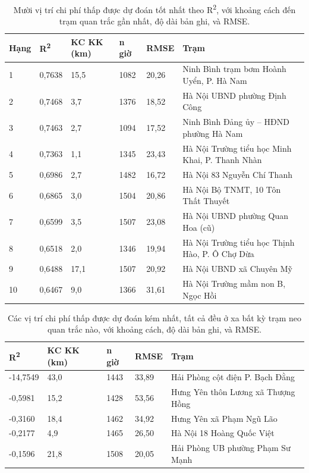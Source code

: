 {\small
\begin{longtable}{llllll}
\caption{Mười vị trí chi phí thấp được dự đoán tốt nhất theo R\textsuperscript{2}, với khoảng cách đến trạm quan trắc gần nhất, độ dài bản ghi, và RMSE.}\\
\toprule
\textbf{Hạng} & \textbf{R\textsuperscript{2}} & \textbf{KC KK (km)} & \textbf{n giờ} & \textbf{RMSE} & \textbf{Trạm} \\
\midrule\endhead
1 & 0,7638 & 15,5 & 1082 & 20,26 & Ninh Bình trạm bơm Hoành Uyển, P. Hà Nam \\
2 & 0,7468 & 3,7 & 1376 & 18,52 & Hà Nội UBND phường Định Công \\
3 & 0,7463 & 2,7 & 1094 & 17,52 & Ninh Bình Đảng ủy -- HĐND phường Hà Nam \\
4 & 0,7363 & 1,1 & 1345 & 23,43 & Hà Nội Trường tiểu học Minh Khai, P. Thanh Nhàn \\
5 & 0,6986 & 2,7 & 1482 & 16,72 & Hà Nội 83 Nguyễn Chí Thanh \\
6 & 0,6865 & 3,0 & 1504 & 20,86 & Hà Nội Bộ TNMT, 10 Tôn Thất Thuyết \\
7 & 0,6599 & 3,5 & 1507 & 23,08 & Hà Nội UBND phường Quan Hoa (cũ) \\
8 & 0,6518 & 2,0 & 1346 & 19,94 & Hà Nội Trường tiểu học Thịnh Hào, P. Ô Chợ Dừa \\
9 & 0,6488 & 17,1 & 1507 & 20,92 & Hà Nội UBND xã Chuyên Mỹ \\
10 & 0,6467 & 9,0 & 1366 & 31,61 & Hà Nội Trường mầm non B, Ngọc Hồi \\
\bottomrule
\end{longtable}
}


{\small
\begin{longtable}{lllll}
\caption{Các vị trí chi phí thấp được dự đoán kém nhất, tất cả đều ở xa bất kỳ trạm neo quan trắc nào, với khoảng cách, độ dài bản ghi, và RMSE.}\\
\toprule
\textbf{R\textsuperscript{2}} & \textbf{KC KK (km)} & \textbf{n giờ} & \textbf{RMSE} & \textbf{Trạm} \\
\midrule\endhead
-14,7549 & 43,0 & 1443 & 33,89 & Hải Phòng cột điện P. Bạch Đằng \\
-0,5981 & 15,2 & 1428 & 53,56 & Hưng Yên thôn Lương xã Thượng Hồng \\
-0,3160 & 18,4 & 1462 & 34,92 & Hưng Yên xã Phạm Ngũ Lão \\
-0,2177 & 4,9 & 1465 & 26,50 & Hà Nội 18 Hoàng Quốc Việt \\
-0,1596 & 21,8 & 1508 & 20,05 & Hải Phòng UB phường Phạm Sư Mạnh \\
\bottomrule
\end{longtable}
}


